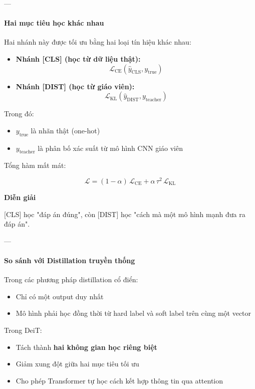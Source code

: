 ---

\paragraph{Hai mục tiêu học khác nhau}

Hai nhánh này được tối ưu bằng hai loại tín hiệu khác nhau:

\begin{itemize}
	\item \textbf{Nhánh [CLS] (học từ dữ liệu thật):}
	\[
	\mathcal{L}_{\text{CE}}(\hat{y}_{\text{CLS}}, y_{\text{true}})
	\]
	
	\item \textbf{Nhánh [DIST] (học từ giáo viên):}
	\[
	\mathcal{L}_{\text{KL}}(\hat{y}_{\text{DIST}}, y_{\text{teacher}})
	\]
\end{itemize}

Trong đó:
\begin{itemize}
	\item $y_{\text{true}}$ là nhãn thật (one-hot)
	\item $y_{\text{teacher}}$ là phân bố xác suất từ mô hình CNN giáo viên
\end{itemize}

Tổng hàm mất mát:

\[
\mathcal{L} = (1-\alpha)\,\mathcal{L}_{\text{CE}} + \alpha\,\tau^2\,\mathcal{L}_{\text{KL}}
\]

\begin{mdframed}[style=infobox]
	\textbf{Diễn giải}
	
	[CLS] học "đáp án đúng", còn [DIST] học "cách mà một mô hình mạnh đưa ra đáp án".
\end{mdframed}

---

\paragraph{So sánh với Distillation truyền thống}

Trong các phương pháp distillation cổ điển:

\begin{itemize}
	\item Chỉ có một output duy nhất
	\item Mô hình phải học đồng thời từ hard label và soft label trên cùng một vector
\end{itemize}

Trong DeiT:

\begin{itemize}
	\item Tách thành \textbf{hai không gian học riêng biệt}
	\item Giảm xung đột giữa hai mục tiêu tối ưu
	\item Cho phép Transformer tự học cách kết hợp thông tin qua attention
\end{itemize}

